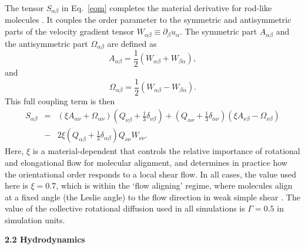 \documentclass[12pt,twoside]{article}
\begin{document}
The tensor $S_{\alpha\beta}$ in Eq.~\ref{eom} completes the material
derivative for rod-like molecules \cite{beris}. It couples the order
parameter to the symmetric and antisymmetric parts of the velocity 
gradient tensor $W_{\alpha \beta}\equiv\partial_\beta u_\alpha$.
The symmetric part $A_{\alpha\beta}$ and the antisymmetric part
$\Omega_{\alpha\beta}$ are defined as 
\begin{equation}
A_{\alpha\beta} = {\textstyle \frac{1}{2}} (W_{\alpha\beta} + W_{\beta\alpha}),
\end{equation}
and
\begin{equation}
\Omega_{\alpha\beta} = {\textstyle \frac{1}{2}} (W_{\alpha\beta} - W_{\beta\alpha}).
\end{equation}
This full coupling term is then
\begin{eqnarray}
\label{coupling-term}
S_{\alpha\beta}  &=&
(\xi A_{\alpha\nu} + \Omega_{\alpha\nu})
(Q_{\nu\beta} + {\textstyle \frac{1}{3}}\delta_{\nu\beta})
+
(Q_{\alpha\nu} + {\textstyle \frac{1}{3}} \delta_{\alpha\nu})
(\xi A_{\nu\beta} - \Omega_{\nu\beta})
\nonumber\\ 
&-&2 \xi ({Q_{\alpha\beta} + {\textstyle \frac{1}{3}}\delta_{\alpha\beta}})
Q_{\nu\nu} W_{\nu\nu}.
\end{eqnarray}
Here, $\xi$ is a material-dependent that controls the
relative importance of rotational and elongational flow for molecular
alignment, and determines in practice how the orientational order
responds to a local shear flow. 
In all cases, the value used here is $\xi = 0.7$, which is within
the `flow aligning' regime, where molecules align at a fixed angle
(the Leslie angle) to the flow direction in weak simple shear \cite{deGennes}.
The value of the collective rotational diffusion used in all simulations is
$\Gamma = 0.5$ in simulation units.

{\bf 2.2 Hydrodynamics}
\end{document}
